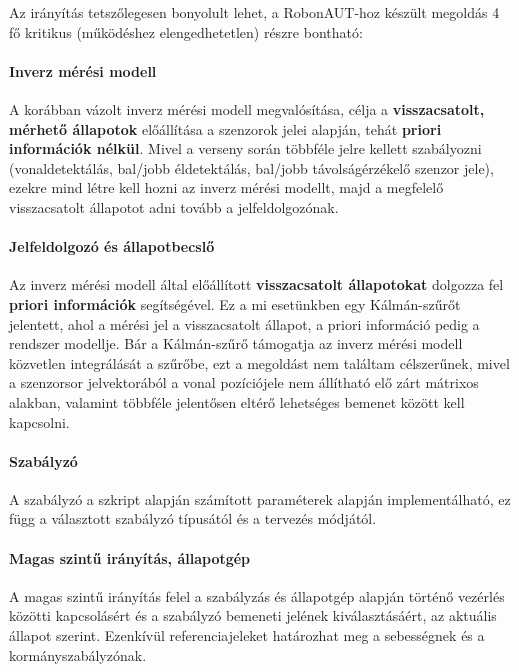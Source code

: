 Az irányítás tetszőlegesen bonyolult lehet, a RobonAUT-hoz készült megoldás 4 fő kritikus (működéshez elengedhetetlen) részre bontható:

\paragraph{Inverz mérési modell}

A korábban vázolt inverz mérési modell megvalósítása, célja a \textbf{visszacsatolt, mérhető állapotok} előállítása a szenzorok jelei alapján, tehát \textbf{priori információk nélkül}. Mivel a verseny során többféle jelre kellett szabályozni (vonaldetektálás, bal/jobb éldetektálás, bal/jobb távolságérzékelő szenzor jele), ezekre mind létre kell hozni az inverz mérési modellt, majd a megfelelő visszacsatolt állapotot adni tovább a jelfeldolgozónak.

\paragraph{Jelfeldolgozó és állapotbecslő}

Az inverz mérési modell által előállított \textbf{visszacsatolt állapotokat} dolgozza fel \textbf{priori információk} segítségével. Ez a mi esetünkben egy Kálmán-szűrőt jelentett, ahol a mérési jel a visszacsatolt állapot, a priori információ pedig a rendszer modellje. Bár a Kálmán-szűrő támogatja az inverz mérési modell közvetlen integrálását a szűrőbe, ezt a megoldást nem találtam célszerűnek, mivel a szenzorsor jelvektorából a vonal pozíciójele nem állítható elő zárt mátrixos alakban, valamint többféle jelentősen eltérő lehetséges bemenet között kell kapcsolni.

\paragraph{Szabályzó}

A szabályzó a szkript alapján számított paraméterek alapján implementálható, ez függ a választott szabályzó típusától és a tervezés módjától.

\paragraph{Magas szintű irányítás, állapotgép}

A magas szintű irányítás felel a szabályzás és állapotgép alapján történő vezérlés közötti kapcsolásért és a szabályzó bemeneti jelének kiválasztásáért, az aktuális állapot szerint. Ezenkívül referenciajeleket határozhat meg a sebességnek és a kormányszabályzónak.

